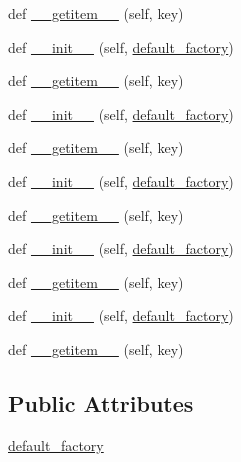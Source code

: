 \begin{DoxyCompactItemize}
\item 
def \hyperlink{classwaflib_1_1_utils_1_1defaultdict_a4c0078abd149716b1d7d2fbfba00c84c}{\+\_\+\+\_\+getitem\+\_\+\+\_\+} (self, key)
\item 
def \hyperlink{classwaflib_1_1_utils_1_1defaultdict_a968729f577547834856268565a96ba06}{\+\_\+\+\_\+init\+\_\+\+\_\+} (self, \hyperlink{classwaflib_1_1_utils_1_1defaultdict_a9e85c1cdac164d19405cbcc3a1fdb9cb}{default\+\_\+factory})
\item 
def \hyperlink{classwaflib_1_1_utils_1_1defaultdict_a4c0078abd149716b1d7d2fbfba00c84c}{\+\_\+\+\_\+getitem\+\_\+\+\_\+} (self, key)
\item 
def \hyperlink{classwaflib_1_1_utils_1_1defaultdict_a968729f577547834856268565a96ba06}{\+\_\+\+\_\+init\+\_\+\+\_\+} (self, \hyperlink{classwaflib_1_1_utils_1_1defaultdict_a9e85c1cdac164d19405cbcc3a1fdb9cb}{default\+\_\+factory})
\item 
def \hyperlink{classwaflib_1_1_utils_1_1defaultdict_a4c0078abd149716b1d7d2fbfba00c84c}{\+\_\+\+\_\+getitem\+\_\+\+\_\+} (self, key)
\item 
def \hyperlink{classwaflib_1_1_utils_1_1defaultdict_a968729f577547834856268565a96ba06}{\+\_\+\+\_\+init\+\_\+\+\_\+} (self, \hyperlink{classwaflib_1_1_utils_1_1defaultdict_a9e85c1cdac164d19405cbcc3a1fdb9cb}{default\+\_\+factory})
\item 
def \hyperlink{classwaflib_1_1_utils_1_1defaultdict_a4c0078abd149716b1d7d2fbfba00c84c}{\+\_\+\+\_\+getitem\+\_\+\+\_\+} (self, key)
\item 
def \hyperlink{classwaflib_1_1_utils_1_1defaultdict_a968729f577547834856268565a96ba06}{\+\_\+\+\_\+init\+\_\+\+\_\+} (self, \hyperlink{classwaflib_1_1_utils_1_1defaultdict_a9e85c1cdac164d19405cbcc3a1fdb9cb}{default\+\_\+factory})
\item 
def \hyperlink{classwaflib_1_1_utils_1_1defaultdict_a4c0078abd149716b1d7d2fbfba00c84c}{\+\_\+\+\_\+getitem\+\_\+\+\_\+} (self, key)
\item 
def \hyperlink{classwaflib_1_1_utils_1_1defaultdict_a968729f577547834856268565a96ba06}{\+\_\+\+\_\+init\+\_\+\+\_\+} (self, \hyperlink{classwaflib_1_1_utils_1_1defaultdict_a9e85c1cdac164d19405cbcc3a1fdb9cb}{default\+\_\+factory})
\item 
def \hyperlink{classwaflib_1_1_utils_1_1defaultdict_a4c0078abd149716b1d7d2fbfba00c84c}{\+\_\+\+\_\+getitem\+\_\+\+\_\+} (self, key)
\end{DoxyCompactItemize}
\subsection*{Public Attributes}
\begin{DoxyCompactItemize}
\item 
\hyperlink{classwaflib_1_1_utils_1_1defaultdict_a9e85c1cdac164d19405cbcc3a1fdb9cb}{default\+\_\+factory}
\end{DoxyCompactItemize}


